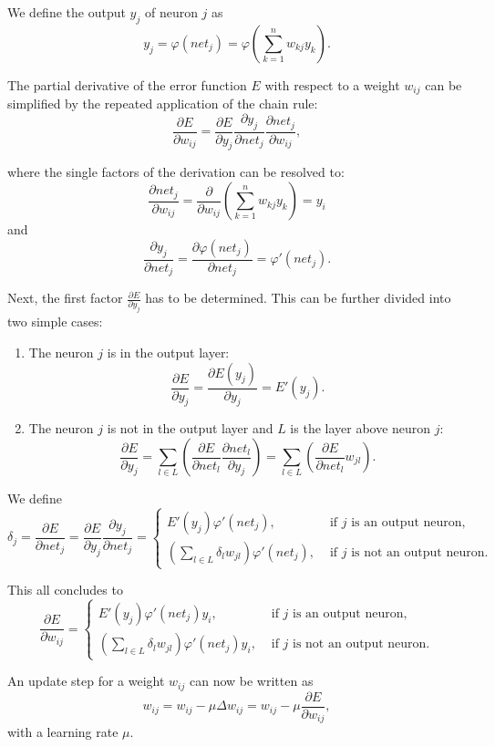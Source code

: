 We define the output $y_j$ of neuron $j$ as
\[
	y_j = \varphi(net_j) = \varphi(\sum_{k=1}^n w_{kj} y_k) .
\]
 
The partial derivative of the error function $E$ with respect to a weight $w_{ij}$ can be simplified by the repeated application of the chain rule:
\[
	\frac{\partial E}{\partial w_{ij}} = \frac{\partial E}{\partial y_j} \frac{\partial y_j}{\partial net_j} \frac{\partial net_j}{\partial w_{ij}} ,
\]
 
where the single factors of the derivation can be resolved to:
\[
	\frac{\partial net_j}{\partial w_{ij}} = \frac{\partial}{\partial w_{ij}} ( \sum_{k=1}^n w_{kj} y_k ) = y_i
\]
and 
\[
	\frac{\partial y_j}{\partial net_j} =  \frac{\partial \varphi(net_j)}{\partial net_j} = \varphi'(net_j).
\]


Next, the first factor $\frac{\partial E}{\partial y_j}$ has to be determined. This can be further divided into two simple cases:
\begin{enumerate}
\item The neuron $j$ is in the output layer:
\[
\frac{\partial E}{\partial y_j} = \frac{\partial E(y_j)}{\partial y_j} = E'(y_j).
\] 

\item The neuron $j$ is not in the output layer and $L$ is the layer above neuron $j$:
\[
\frac{\partial E}{\partial y_j} = \sum_{l \in L}( \frac{\partial E}{\partial net_l} \frac{\partial net_l}{\partial y_j} )  = \sum_{l \in L}( \frac{\partial E}{\partial net_l} w_{jl} ).
\] 
\end{enumerate}
 
We define 
\[
\delta_j = \frac{\partial E}{\partial net_j} = \frac{\partial E}{\partial y_j} \frac{\partial y_j}{\partial net_j} =
\begin{cases}
E'(y_j) \varphi'(net_j), & \text{  if } j \text{ is an output neuron,} \\
(\sum_{l \in L} \delta_l w_{jl}) \varphi'(net_j), & \text{  if } j \text{ is not an output neuron.}
\end{cases}
\]

This all concludes to 
\[
\frac{\partial E}{\partial w_{ij}} = 
\begin{cases}
E'(y_j) \varphi'(net_j) y_{i}, & \text{  if } j \text{ is an output neuron,} \\
(\sum_{l \in L} \delta_l w_{jl}) \varphi'(net_j) y_{i}, & \text{  if } j \text{ is not an output neuron.}
\end{cases}
\]

An update step for a weight $w_{ij}$ can now be written as
\[
w_{ij} = w_{ij} - \mu \Delta w_{ij} = w_{ij} - \mu \frac{\partial E}{\partial w_{ij}},
\]
with a learning rate $\mu$.

